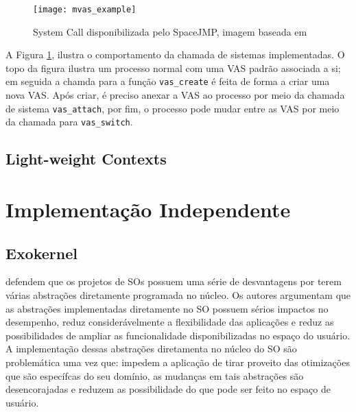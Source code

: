 \begin{figure}[!h]
  \centering
  \texttt{[image: mvas\_example]} 
  \caption{System Call disponibilizada pelo SpaceJMP, imagem baseada em \cite{ellarge}}
  \label{fig:mvas_example}
\end{figure}

A Figura \ref{fig:mvas_example}, ilustra o comportamento da chamada de sistemas
implementadas. O topo da figura ilustra um processo normal com uma VAS padrão
associada a si; em seguida a chamda para a função \texttt{vas\_create} é feita
de forma a criar uma nova VAS. Após criar, é preciso anexar a VAS ao processo
por meio da chamada de sistema \texttt{vas\_attach}, por fim, o processo pode
mudar entre as VAS por meio da chamada para \texttt{vas\_switch}.

\subsection{Light-weight Contexts}


\section{Implementação Independente}

\subsection{Exokernel}

\cite{exokernel} defendem que os projetos de SOs possuem uma série de
desvantagens por terem várias abstrações diretamente programada no núcleo. Os
autores argumentam que as abstrações implementadas diretamente no SO possuem
sérios impactos no desempenho, reduz considerávelmente a flexibilidade das
aplicações e reduz as possibilidades de ampliar as funcionalidade
disponibilizadas no espaço do usuário. A implementação dessas abstrações
diretamenta no núcleo do SO são problemática uma vez que: impedem a aplicação
de tirar proveito das otimizações que são específcas do seu domínio, as
mudanças em tais abstrações são desencorajadas e reduzem as possibilidade do
que pode ser feito no espaço de usuário.

